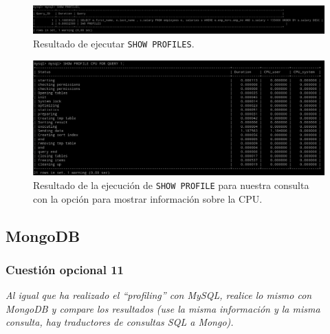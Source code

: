 \begin{figure}[H]
  \begin{center}
    \includegraphics[width=1\textwidth]{imagenes/profs}
    \caption{Resultado de ejecutar \texttt{SHOW PROFILES}.}
    \label{fig27}
  \end{center}
\end{figure}

\begin{figure}[H]
  \begin{center}
    \includegraphics[width=1\textwidth]{imagenes/mpr}
    \caption{Resultado de la ejecución de \texttt{SHOW PROFILE} para nuestra consulta con la opción para mostrar información sobre la CPU.}
    \label{fig28}
  \end{center}
\end{figure}

\subsection{MongoDB}
\subsubsection{Cuestión opcional 11}
\textit{Al igual que ha realizado el ``profiling'' con MySQL, realice lo mismo con MongoDB y compare los resultados (use la misma información y la misma consulta, hay traductores de consultas SQL a Mongo).}

\newpage




